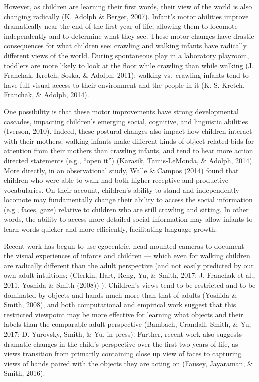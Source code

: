 \documentclass[10pt, letterpaper]{article}
\begin{document}
However, as children are learning their first words, their view of the
world is also changing radically (K. Adolph \& Berger, 2007). Infant's
motor abilities improve dramatically near the end of the first year of
life, allowing them to locomote independently and to determine what they
see. These motor changes have drastic consequences for what children
see: crawling and walking infants have radically different views of the
world. During spontaneous play in a laboratory playroom, toddlers are
more likely to look at the floor while crawling than while walking (J.
Franchak, Kretch, Soska, \& Adolph, 2011); walking vs.~crawling infants
tend to have full visual access to their environment and the people in
it (K. S. Kretch, Franchak, \& Adolph, 2014).

One possibility is that these motor improvements have strong
developmental cascades, impacting children's emerging social, cognitive,
and linguistic abilities (Iverson, 2010). Indeed, these postural changes
also impact how children interact with their mothers; walking infants
make different kinds of object-related bids for attention from their
mothers than crawling infants, and tend to hear more action directed
statements (e.g., ``open it'') (Karasik, Tamis-LeMonda, \& Adolph,
2014). More directly, in an observational study, Walle \& Campos (2014)
found that children who were able to walk had both higher receptive and
productive vocabularies. On their account, children's ability to stand
and independently locomote may fundamentally change their ability to
access the social information (e.g., faces, gaze) relative to children
who are still crawling and sitting. In other words, the ability to
access more detailed social information may allow infants to learn words
quicker and more efficiently, facilitating language growth.

Recent work has begun to use egocentric, head-mounted cameras to
document the visual experiences of infants and children --- which even
for walking children are radically different than the adult perspective
(and not easily predicted by our own adult intuitions; (Clerkin, Hart,
Rehg, Yu, \& Smith, 2017; J. Franchak et al., 2011, Yoshida \& Smith
(2008)) ). Children's views tend to be restricted and to be dominated by
objects and hands much more than that of adults (Yoshida \& Smith,
2008), and both computational and empirical work suggest that this
restricted viewpoint may be more effective for learning what objects and
their labels than the comparable adult perspective (Bambach, Crandall,
Smith, \& Yu, 2017; D. Yurovsky, Smith, \& Yu, in press). Further,
recent work also suggests dramatic changes in the child's perspective
over the first two years of life, as views transition from primarily
containing close up view of faces to capturing views of hands paired
with the objects they are acting on (Fausey, Jayaraman, \& Smith, 2016).
\end{document}

